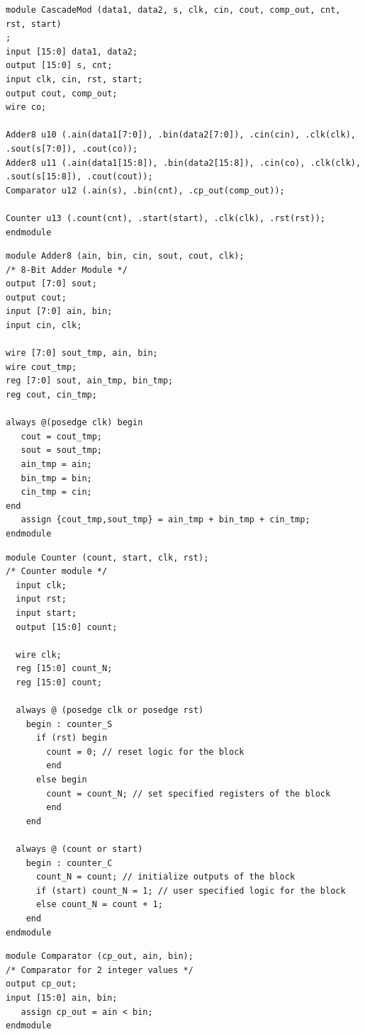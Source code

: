 \begin{lstlisting}[caption={CascadeMod.v},label=ex:cascademod-v]
module CascadeMod (data1, data2, s, clk, cin, cout, comp_out, cnt, rst, start)
;
input [15:0] data1, data2;
output [15:0] s, cnt;
input clk, cin, rst, start;
output cout, comp_out;
wire co;

Adder8 u10 (.ain(data1[7:0]), .bin(data2[7:0]), .cin(cin), .clk(clk),
.sout(s[7:0]), .cout(co));
Adder8 u11 (.ain(data1[15:8]), .bin(data2[15:8]), .cin(co), .clk(clk),
.sout(s[15:8]), .cout(cout));
Comparator u12 (.ain(s), .bin(cnt), .cp_out(comp_out));

Counter u13 (.count(cnt), .start(start), .clk(clk), .rst(rst));
endmodule
\end{lstlisting}

\begin{lstlisting}[caption={Adder8.v},label=ex:adder8-v]
module Adder8 (ain, bin, cin, sout, cout, clk);
/* 8-Bit Adder Module */
output [7:0] sout;
output cout;
input [7:0] ain, bin;
input cin, clk;

wire [7:0] sout_tmp, ain, bin;
wire cout_tmp;
reg [7:0] sout, ain_tmp, bin_tmp;
reg cout, cin_tmp;

always @(posedge clk) begin
   cout = cout_tmp;
   sout = sout_tmp;
   ain_tmp = ain;
   bin_tmp = bin;
   cin_tmp = cin;
end
   assign {cout_tmp,sout_tmp} = ain_tmp + bin_tmp + cin_tmp;
endmodule
\end{lstlisting}

\begin{lstlisting}[caption={Counter.v},label=ex:counter-v]
module Counter (count, start, clk, rst);
/* Counter module */
  input clk;
  input rst;
  input start;
  output [15:0] count;

  wire clk;
  reg [15:0] count_N;
  reg [15:0] count;

  always @ (posedge clk or posedge rst)
    begin : counter_S
      if (rst) begin
        count = 0; // reset logic for the block
        end
      else begin
        count = count_N; // set specified registers of the block
        end
    end

  always @ (count or start)
    begin : counter_C
      count_N = count; // initialize outputs of the block
      if (start) count_N = 1; // user specified logic for the block
      else count_N = count + 1;
    end
endmodule
\end{lstlisting}

\begin{lstlisting}[caption={Comparator.v},label=ex:comp-v]
module Comparator (cp_out, ain, bin);
/* Comparator for 2 integer values */
output cp_out;
input [15:0] ain, bin;
   assign cp_out = ain < bin;
endmodule
\end{lstlisting}

